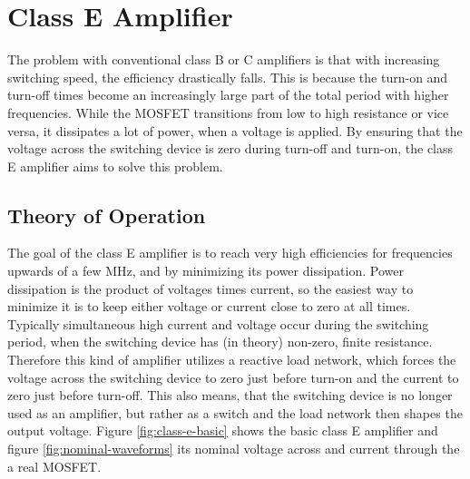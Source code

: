 \section{Class E Amplifier}

The problem with conventional class B or C amplifiers is that with increasing switching speed, the efficiency drastically falls. This is because the turn-on and turn-off times become an increasingly large part of the total period with higher frequencies. While the MOSFET transitions from low to high resistance or vice versa, it dissipates a lot of power, when a voltage is applied. By ensuring that the voltage across the switching device is zero during turn-off and turn-on, the class E amplifier aims to solve this problem.

\subsection{Theory of Operation}

The goal of the class E amplifier is to reach very high efficiencies for frequencies upwards of a few MHz, and by minimizing its power dissipation. Power dissipation is the product of voltages times current, so the easiest way to minimize it is to keep either voltage or current close to zero at all times. Typically simultaneous high current and voltage occur during the switching period, when the switching device has (in theory) non-zero, finite resistance. Therefore this kind of amplifier utilizes a reactive load network, which forces the voltage across the switching device to zero just before turn-on and the current to zero just before turn-off. This also means, that the switching device is no longer used as an amplifier, but rather as a switch and the load network then shapes the output voltage. Figure \ref{fig:class-e-basic} shows the basic class E amplifier and figure \ref{fig:nominal-waveforms} its nominal voltage across and current through the a real MOSFET.

